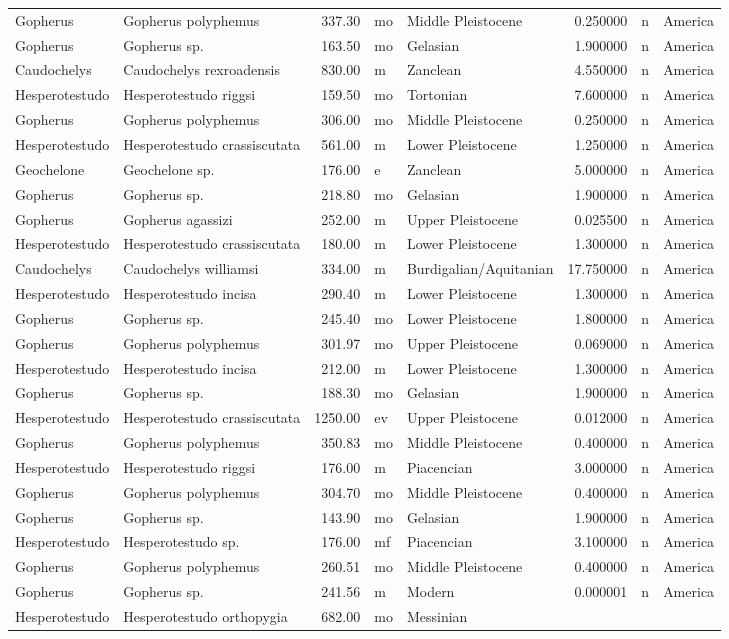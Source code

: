 \begin{landscape}
\begin{longtable}[]{@{}llrllrll@{}}
	Gopherus & Gopherus polyphemus & 337.30 & mo & Middle Pleistocene &
	0.250000 & n & America\tabularnewline
	Gopherus & Gopherus sp. & 163.50 & mo & Gelasian & 1.900000 & n &
	America\tabularnewline
	Caudochelys & Caudochelys rexroadensis & 830.00 & m & Zanclean &
	4.550000 & n & America\tabularnewline
	Hesperotestudo & Hesperotestudo riggsi & 159.50 & mo & Tortonian &
	7.600000 & n & America\tabularnewline
	Gopherus & Gopherus polyphemus & 306.00 & mo & Middle Pleistocene &
	0.250000 & n & America\tabularnewline
	Hesperotestudo & Hesperotestudo crassiscutata & 561.00 & m & Lower
	Pleistocene & 1.250000 & n & America\tabularnewline
	Geochelone & Geochelone sp. & 176.00 & e & Zanclean & 5.000000 & n &
	America\tabularnewline
	Gopherus & Gopherus sp. & 218.80 & mo & Gelasian & 1.900000 & n &
	America\tabularnewline
	Gopherus & Gopherus agassizi & 252.00 & m & Upper Pleistocene & 0.025500
	& n & America\tabularnewline
	Hesperotestudo & Hesperotestudo crassiscutata & 180.00 & m & Lower
	Pleistocene & 1.300000 & n & America\tabularnewline
	Caudochelys & Caudochelys williamsi & 334.00 & m &
	Burdigalian/Aquitanian & 17.750000 & n & America\tabularnewline
	Hesperotestudo & Hesperotestudo incisa & 290.40 & m & Lower Pleistocene
	& 1.300000 & n & America\tabularnewline
	Gopherus & Gopherus sp. & 245.40 & mo & Lower Pleistocene & 1.800000 & n
	& America\tabularnewline
	Gopherus & Gopherus polyphemus & 301.97 & mo & Upper Pleistocene &
	0.069000 & n & America\tabularnewline
	Hesperotestudo & Hesperotestudo incisa & 212.00 & m & Lower Pleistocene
	& 1.300000 & n & America\tabularnewline
	Gopherus & Gopherus sp. & 188.30 & mo & Gelasian & 1.900000 & n &
	America\tabularnewline
	Hesperotestudo & Hesperotestudo crassiscutata & 1250.00 & ev & Upper
	Pleistocene & 0.012000 & n & America\tabularnewline
	Gopherus & Gopherus polyphemus & 350.83 & mo & Middle Pleistocene &
	0.400000 & n & America\tabularnewline
	Hesperotestudo & Hesperotestudo riggsi & 176.00 & m & Piacencian &
	3.000000 & n & America\tabularnewline
	Gopherus & Gopherus polyphemus & 304.70 & mo & Middle Pleistocene &
	0.400000 & n & America\tabularnewline
	Gopherus & Gopherus sp. & 143.90 & mo & Gelasian & 1.900000 & n &
	America\tabularnewline
	Hesperotestudo & Hesperotestudo sp. & 176.00 & mf & Piacencian &
	3.100000 & n & America\tabularnewline
	Gopherus & Gopherus polyphemus & 260.51 & mo & Middle Pleistocene &
	0.400000 & n & America\tabularnewline
	Gopherus & Gopherus sp. & 241.56 & m & Modern & 0.000001 & n &
	America\tabularnewline
	Hesperotestudo & Hesperotestudo orthopygia & 682.00 & mo & Messinian &

\end{longtable}
\end{landscape}

